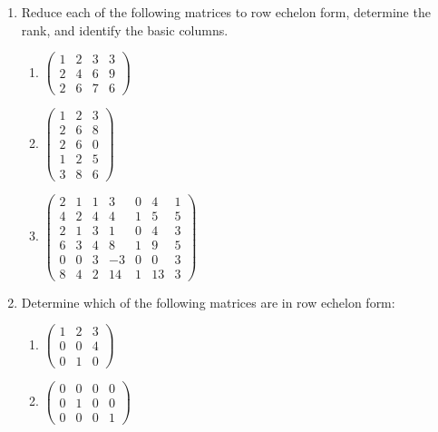 \begin{enumerate}[leftmargin=*, label=\bfseries 2.1.\arabic*]

\item Reduce each of the following matrices to row echelon form, determine the rank, and identify the basic columns.

\begin{enumerate}[label=(\alph*)]
    \item $\begin{pmatrix}
        1 & 2 & 3 & 3 \\
        2 & 4 & 6 & 9 \\
        2 & 6 & 7 & 6
    \end{pmatrix}$
    
    \item $\begin{pmatrix}
        1 & 2 & 3 \\
        2 & 6 & 8 \\
        2 & 6 & 0 \\
        1 & 2 & 5 \\
        3 & 8 & 6
    \end{pmatrix}$
    
    \item $\begin{pmatrix}
        2 & 1 & 1 & 3 & 0 & 4 & 1 \\
        4 & 2 & 4 & 4 & 1 & 5 & 5 \\
        2 & 1 & 3 & 1 & 0 & 4 & 3 \\
        6 & 3 & 4 & 8 & 1 & 9 & 5 \\
        0 & 0 & 3 & -3 & 0 & 0 & 3 \\
        8 & 4 & 2 & 14 & 1 & 13 & 3
    \end{pmatrix}$
\end{enumerate}

\item Determine which of the following matrices are in row echelon form:

\begin{enumerate}[label=(\alph*)]
    \item $\begin{pmatrix}
        1 & 2 & 3 \\
        0 & 0 & 4 \\
        0 & 1 & 0
    \end{pmatrix}$
    
    \item $\begin{pmatrix}
        0 & 0 & 0 & 0 \\
        0 & 1 & 0 & 0 \\
        0 & 0 & 0 & 1
    \end{pmatrix}$
    

\end{enumerate}
\end{enumerate}
